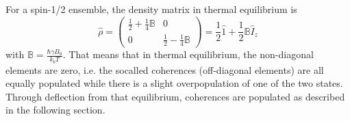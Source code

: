     For a spin-1/2 ensemble, the density matrix in thermal equilibrium is
    \begin{equation}
        \hat \rho = \begin{pmatrix} \frac{1}{2}+\frac{1}{4}\mathbb{B}& 0\\ 0&
        \frac{1}{2}-\frac{1}{4}\mathbb{B}\end{pmatrix} = \frac {1}{2} \hat1 + \frac{1}{2} \mathbb{B}
        \hat I_z
    \end{equation}
    with $\mathbb{B} = \frac{\hbar\gamma B_0}{k_b T}$. That means that in thermal equilibrium, the
    non-diagonal elements are zero, i.e. the socalled coherences (off-diagonal elements) are all
    equally populated while there is a slight overpopulation of one of the two states. Through deflection from that
    equilibrium, coherences are populated as described in the following section.

